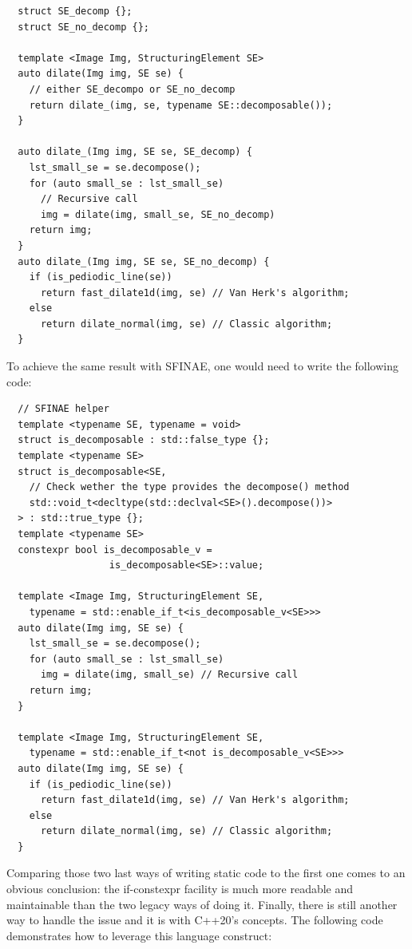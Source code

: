\begin{verbatim}
  struct SE_decomp {};
  struct SE_no_decomp {};

  template <Image Img, StructuringElement SE>
  auto dilate(Img img, SE se) {
    // either SE_decompo or SE_no_decomp
    return dilate_(img, se, typename SE::decomposable());
  }

  auto dilate_(Img img, SE se, SE_decomp) {
    lst_small_se = se.decompose();
    for (auto small_se : lst_small_se)
      // Recursive call
      img = dilate(img, small_se, SE_no_decomp)
    return img;
  }
  auto dilate_(Img img, SE se, SE_no_decomp) {
    if (is_pediodic_line(se))
      return fast_dilate1d(img, se) // Van Herk's algorithm;
    else
      return dilate_normal(img, se) // Classic algorithm;
  }
\end{verbatim}

To achieve the same result with SFINAE, one would need to write the following code:

\begin{verbatim}
  // SFINAE helper
  template <typename SE, typename = void>
  struct is_decomposable : std::false_type {};
  template <typename SE>
  struct is_decomposable<SE,
    // Check wether the type provides the decompose() method
    std::void_t<decltype(std::declval<SE>().decompose())>
  > : std::true_type {};
  template <typename SE>
  constexpr bool is_decomposable_v =
                  is_decomposable<SE>::value;

  template <Image Img, StructuringElement SE,
    typename = std::enable_if_t<is_decomposable_v<SE>>>
  auto dilate(Img img, SE se) {
    lst_small_se = se.decompose();
    for (auto small_se : lst_small_se)
      img = dilate(img, small_se) // Recursive call
    return img;
  }

  template <Image Img, StructuringElement SE,
    typename = std::enable_if_t<not is_decomposable_v<SE>>>
  auto dilate(Img img, SE se) {
    if (is_pediodic_line(se))
      return fast_dilate1d(img, se) // Van Herk's algorithm;
    else
      return dilate_normal(img, se) // Classic algorithm;
  }
\end{verbatim}

Comparing those two last ways of writing static code to the first one comes to an obvious conclusion: the if-constexpr
facility is much more readable and maintainable than the two legacy ways of doing it. Finally, there is still another
way to handle the issue and it is with C++20's concepts. The following code demonstrates how to leverage this language
construct:

